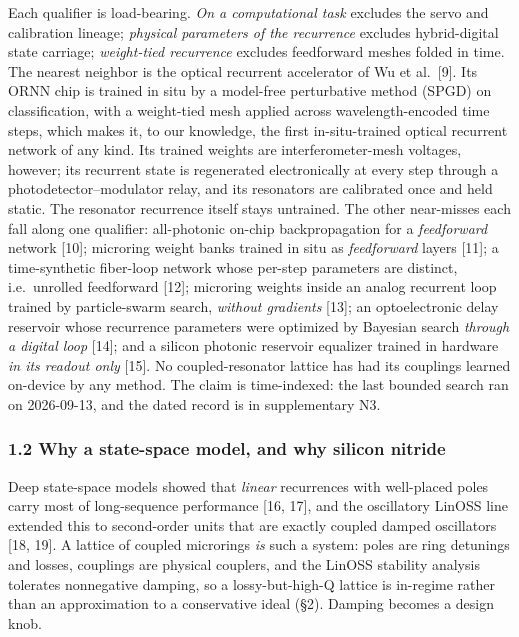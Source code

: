 \documentclass[
  10pt,
]{article}
\begin{document}
Each qualifier is load-bearing. \emph{On a computational task} excludes
the servo and calibration lineage; \emph{physical parameters of the
recurrence} excludes hybrid-digital state carriage; \emph{weight-tied
recurrence} excludes feedforward meshes folded in time. The nearest
neighbor is the optical recurrent accelerator of Wu et al.~{[}9{]}. Its
ORNN chip is trained in situ by a model-free perturbative method (SPGD)
on classification, with a weight-tied mesh applied across
wavelength-encoded time steps, which makes it, to our knowledge, the
first in-situ-trained optical recurrent network of any kind. Its trained
weights are interferometer-mesh voltages, however; its recurrent state
is regenerated electronically at every step through a
photodetector--modulator relay, and its resonators are calibrated once
and held static. The resonator recurrence itself stays untrained. The
other near-misses each fall along one qualifier: all-photonic on-chip
backpropagation for a \emph{feedforward} network {[}10{]}; microring
weight banks trained in situ as \emph{feedforward} layers {[}11{]}; a
time-synthetic fiber-loop network whose per-step parameters are
distinct, i.e.~unrolled feedforward {[}12{]}; microring weights inside
an analog recurrent loop trained by particle-swarm search, \emph{without
gradients} {[}13{]}; an optoelectronic delay reservoir whose recurrence
parameters were optimized by Bayesian search \emph{through a digital
loop} {[}14{]}; and a silicon photonic reservoir equalizer trained in
hardware \emph{in its readout only} {[}15{]}. No coupled-resonator
lattice has had its couplings learned on-device by any method. The claim
is time-indexed: the last bounded search ran on 2026-09-13, and the
dated record is in supplementary N3.

\subsubsection{1.2 Why a state-space model, and why silicon
nitride}\label{why-a-state-space-model-and-why-silicon-nitride}

Deep state-space models showed that \emph{linear} recurrences with
well-placed poles carry most of long-sequence performance {[}16, 17{]},
and the oscillatory LinOSS line extended this to second-order units that
are exactly coupled damped oscillators {[}18, 19{]}. A lattice of
coupled microrings \emph{is} such a system: poles are ring detunings and
losses, couplings are physical couplers, and the LinOSS stability
analysis tolerates nonnegative damping, so a lossy-but-high-Q lattice is
in-regime rather than an approximation to a conservative ideal (§2).
Damping becomes a design knob.
\end{document}
